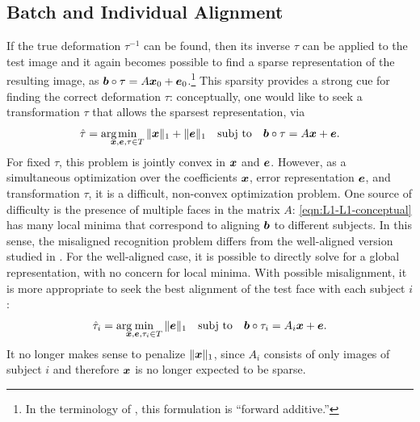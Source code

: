\subsection{Batch and Individual Alignment} If the
true deformation $\tau^{-1}$ can be found, then
its inverse $\tau$ can be applied to the test image and it again becomes
possible to find a sparse representation of the resulting
image, as $\boldsymbol{b} \circ \tau = A {\boldsymbol{x}}_0 + \boldsymbol{e}_0$.\footnote{In the terminology of \cite{baker2004lucas}, this formulation is ``forward additive.''}
  This sparsity
provides a strong cue for finding the correct deformation
$\tau$: conceptually, one would like to seek a transformation
$\tau$ that allows the sparsest representation, via
\begin{equation} \label{eqn:L1-L1-conceptual}
\hat{\tau} = \arg\hspace{-2.5mm}\min_{\x,\e,\tau \in T} \| \x \|_1 + \| \e \|_1 \quad \subj \quad \bb \circ \tau = A \x + \e.
\end{equation}
For fixed $\tau$, this problem is jointly convex in ${\boldsymbol{x}}$ and
$\boldsymbol{e}$. However, as a simultaneous optimization over the
coefficients ${\boldsymbol{x}}$, error representation $\boldsymbol{e}$, and
transformation $\tau$, it is a difficult, non-convex
optimization problem. One source of difficulty is the presence
of multiple faces in the matrix $A$:
\eqref{eqn:L1-L1-conceptual} has many local minima that
correspond to aligning $\boldsymbol{b}$ to different subjects. In this
sense, the misaligned recognition problem differs from the
well-aligned version studied in \cite{Wright2009-PAMI}. For the
well-aligned case, it is possible to directly solve for a
global representation, with no concern for local minima. With
possible misalignment, it is more appropriate to seek the best
alignment of the test face with each subject $i$:
\begin{equation} \label{eqn:per-subject-L1}
\hat \tau_i = \arg\hspace{-2.5mm}\min_{\x,\e,\tau_i \in T} \| \e \|_1 \quad \subj \quad \bb \circ \tau_i = A_i \x + \e.
\end{equation}
It no longer makes sense to penalize $\| {\boldsymbol{x}} \|_1$, since $A_i$ consists of
only images of subject $i$ and therefore ${\boldsymbol{x}}$ is no longer expected to
be sparse.

